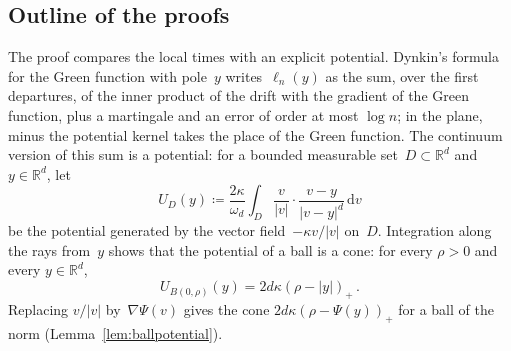 \documentclass[11pt]{amsart}
\theoremstyle{plain}
\theoremstyle{definition}
\newcommand{\R}{\mathbb R}
\newcommand{\drift}{\kappa}
\newcommand{\gauge}{\Psi}
\newcommand{\dd}{\,\mathrm d}
\numberwithin{equation}{section}
\begin{document}
\subsection{Outline of the proofs}\label{sec:strategy}

The proof compares the local times with an explicit potential. Dynkin's formula for the Green function with pole~$y$ writes~$\ell_n(y)$ as the sum, over the first departures, of the inner product of the drift with the gradient of the Green function, plus a martingale and an error of order at most $\log n$; in the plane, minus the potential kernel takes the place of the Green function. The continuum version of this sum is a potential: for a bounded measurable set~$D\subset\R^d$ and $y\in\R^d$, let
\begin{equation}\label{eq:potential-intro}
U_D(y)\coloneqq\frac{2\drift}{\omega_d}\int_D\frac{v}{|v|}\cdot\frac{v-y}{|v-y|^d}\dd v
\end{equation}
be the potential generated by the vector field~$-\drift v/|v|$ on~$D$. Integration along the rays from~$y$ shows that the potential of a ball is a cone: for every $\rho>0$ and every $y\in\R^d$,
\begin{equation}\label{eq:ballpotential-euclid}
U_{B(0,\rho)}(y)=2d\drift(\rho-|y|)_+\, .
\end{equation}
Replacing $v/|v|$ by~$\nabla\gauge(v)$ gives the cone $2d\drift(\rho-\gauge(y))_+$ for a ball of the norm (Lemma~\ref{lem:ballpotential}).
\end{document}

